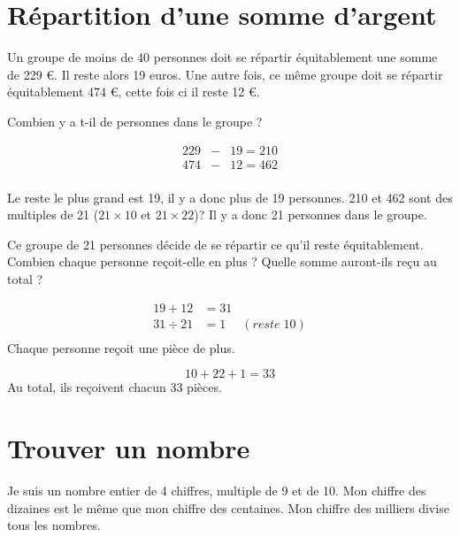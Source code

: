 \documentclass[a4paper,11pt]{exam}
\begin{document}
\section{Répartition d'une somme d'argent}
	Un groupe de moins de 40 personnes doit se répartir équitablement une somme de 229 €. Il reste alors 19 euros. Une autre fois, ce même groupe doit se répartir équitablement 474  €, cette fois ci il reste 12 €.
	\begin{questions} %
		
		\question Combien y a t-il de personnes dans le groupe ?
		\begin{solution}
			\begin{eqnarray*}
				\num{229} & - & \num{19} = \num{210} \\
				\num{474} & - & \num{12} = \num{462} \\
			\end{eqnarray*}
			
			Le reste le plus grand est 19, il y a donc plus de 19 personnes.
			\num{210} et \num{462} sont des multiples de 21 ($21 \times 10$ et $21 \times 22$)? Il y a donc 21 personnes dans le groupe. 
			
		\end{solution}
		
		\question Ce groupe de 21 personnes décide de se répartir ce qu'il reste équitablement. Combien chaque personne reçoit-elle en plus ? Quelle somme auront-ils reçu au total ?
		
		\begin{solution}
			\begin{eqnarray*}
				\num{19} + \num{12} &= \num{31} \\
				\num{31} \div \num{21} &= 1 & (reste \; 10) \\
			\end{eqnarray*}
			Chaque personne reçoit une pièce de plus.
			
			\begin{equation*}
				\num{10} + \num{22} + \num{1} = \num{33}
			\end{equation*}
			Au total, ils reçoivent chacun \num{33} pièces.
		\end{solution}
	\end{questions}
	
\section{Trouver un nombre}
	
	Je suis un nombre entier de 4 chiffres, multiple de 9 et de 10.
	Mon chiffre des dizaines est le même que mon chiffre des centaines.
	Mon chiffre des milliers divise tous les nombres.
	
\end{document}

